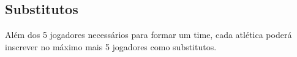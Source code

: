 \subsection{Substitutos}

Além dos 5 jogadores necessários para formar um time, cada atlética poderá inscrever no máximo mais 5 jogadores como substitutos.
